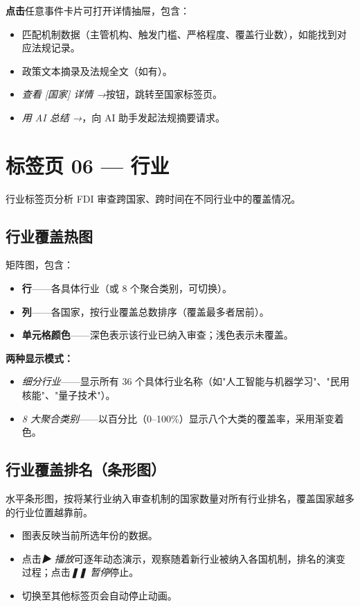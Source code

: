 \documentclass[12pt,a4paper]{article}
\newcommand{\uielem}[1]{\textit{#1}}
\begin{document}
\textbf{点击}任意事件卡片可打开详情抽屉，包含：
\begin{itemize}
  \item 匹配机制数据（主管机构、触发门槛、严格程度、覆盖行业数），如能找到对应法规记录。
  \item 政策文本摘录及法规全文（如有）。
  \item \uielem{查看 [国家] 详情 →}按钮，跳转至国家标签页。
  \item \uielem{用 AI 总结 →}，向 AI 助手发起法规摘要请求。
\end{itemize}

\section{标签页 06 — 行业}
\label{sec:sectors}

行业标签页分析 FDI 审查跨国家、跨时间在不同行业中的覆盖情况。

\subsection{行业覆盖热图}

矩阵图，包含：
\begin{itemize}
  \item \textbf{行}——各具体行业（或 8 个聚合类别，可切换）。
  \item \textbf{列}——各国家，按行业覆盖总数排序（覆盖最多者居前）。
  \item \textbf{单元格颜色}——深色表示该行业已纳入审查；浅色表示未覆盖。
\end{itemize}

\textbf{两种显示模式：}
\begin{itemize}
  \item \uielem{细分行业}——显示所有 36 个具体行业名称（如"人工智能与机器学习"、"民用核能"、"量子技术"）。
  \item \uielem{8 大聚合类别}——以百分比（0--100\%）显示八个大类的覆盖率，采用渐变着色。
\end{itemize}

\subsection{行业覆盖排名（条形图）}

水平条形图，按将某行业纳入审查机制的国家数量对所有行业排名，覆盖国家越多的行业位置越靠前。

\begin{itemize}
  \item 图表反映当前所选年份的数据。
  \item 点击\uielem{▶ 播放}可逐年动态演示，观察随着新行业被纳入各国机制，排名的演变过程；点击\uielem{❚❚ 暂停}停止。
  \item 切换至其他标签页会自动停止动画。
\end{itemize}
\end{document}
